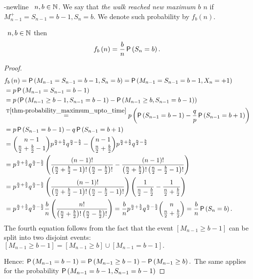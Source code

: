 \begin{defn}\label{defn-new_maximum}
  \todo-newline
 \Lrw\ $n,b\in \mathbb{N}$. We say that \emph{the walk reached new maximum $b$ \intime $n$} if $M_{n-1}^+=S_{n-1}=b-1, S_n=b$. We denote such probability by $f_b \left( n \right).$
\end{defn}
\begin{thm}\label{thm-probability_new_maximum}
 \Lrw\ $n,b \in \mathbb{N}$ then
 \[
  f_b \left( n \right) =\frac{b}{n}\operatorname{\mathsf{P}} \left( S_n=b \right).
 \]
\end{thm}
\begin{proof}
  \[
  \begin{split}
    & f_b\left(n\right)  = \operatorname{\mathsf{P}} \left( M_{n-1}=S_{n-1}=b-1, S_n=b \right)
    =\operatorname{\mathsf{P}} \left(M_{n-1}=S_{n-1}=b-1, X_n=+1\right)\\
    & =p\operatorname{\mathsf{P}} \left( M_{n-1}=S_{n-1}=b-1 \right)\\
    & =p \left( \operatorname{\mathsf{P}} \left( M_{n-1}\geq b-1, S_{n-1}=b-1 \right) -\operatorname{\mathsf{P}} \left( M_{n-1}\geq b, S_{n-1}=b-1 \right) \right) \\
    & \overset{\text{T}\ref{thm-probability_maximum_upto_time}}{=}p \left( \operatorname{\mathsf{P}} \left( S_{n-1}=b-1 \right) -\frac{q}{p}\operatorname{\mathsf{P}} \left( S_{n-1}=b+1 \right) \right) \\
    & =p\operatorname{\mathsf{P}} \left( S_{n-1}=b-1 \right) -q \operatorname{\mathsf{P}} \left( S_{n-1}=b+1 \right) \\
    & =\binom{n-1}{\frac{n}{2}+\frac{b}{2}-1}p^{\frac{n}{2}+\frac{b}{2}}q^{\frac{n}{2}-\frac{b}{2}}-\binom{n-1}{\frac{n}{2}+\frac{b}{2}}
    p^{\frac{n}{2}+\frac{b}{2}}q^{\frac{n}{2}-\frac{b}{2}}\\
    & =p^{\frac{n}{2}+\frac{b}{2}}q^{\frac{n}{2}-\frac{b}{2}} \left( \frac{ \left( n-1 \right) !}{ \left( \frac{n}{2}+\frac{b}{2}-1 \right) ! \left( \frac{n}{2}-\frac{b}{2} \right) !}-\frac{ \left( n-1 \right) !}{ \left( \frac{n}{2}+\frac{b}{2} \right) ! \left( \frac{n}{2}-\frac{b}{2}-1 \right) !} \right)\\
    & =p^{\frac{n}{2}+\frac{b}{2}}q^{\frac{n}{2}-\frac{b}{2}} \left( \frac{ \left( n-1 \right) !}{ \left( \frac{n}{2}+\frac{b}{2}-1 \right) ! \left( \frac{n}{2}-\frac{b}{2}-1 \right) !} \right) \left( \frac{1}{\frac{n}{2}-\frac{b}{2}}-\frac{1}{\frac{n}{2}+\frac{b}{2}} \right) \\
    & =p^{\frac{n}{2}+\frac{b}{2}}q^{\frac{n}{2}-\frac{b}{2}}\frac{b}{n} \left( \frac{n!}{ \left( \frac{n}{2}+\frac{b}{2} \right) ! \left( \frac{n}{2}-\frac{b}{2} \right) !} \right)
    =\frac{b}{n}p^{\frac{n}{2}+\frac{b}{2}}q^{\frac{n}{2}-\frac{b}{2}}\binom{n}{\frac{n}{2}+\frac{b}{2}}
    =\frac{b}{n}\operatorname{\mathsf{P}} \left( S_n=b \right).
     \end{split}
  \]
 The fourth equation follows from the fact that the event $[M_{n-1}\geq b-1]$ can be split into two disjoint events:
 $[M_{n-1}\geq b-1]=[M_{n-1}\geq b]\cup [M_{n-1}=b-1].$

 Hence: $\operatorname{\mathsf{P}}\left(M_{n-1}=b-1\right)=\operatorname{\mathsf{P}}\left(M_{n-1}\geq b-1\right)-\operatorname{\mathsf{P}}\left(M_{n-1}\geq b\right).$ The same applies for the probability $\operatorname{\mathsf{P}}\left(M_{n-1}=b-1, S_{n-1}=b-1\right)
 $
\end{proof}
